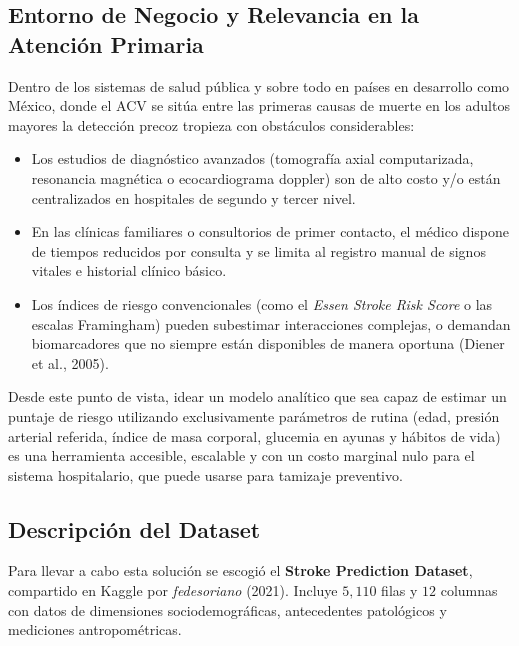 \documentclass[12pt,a4paper]{article}
\begin{document}
\subsection{Entorno de Negocio y Relevancia en la Atención Primaria}
Dentro de los sistemas de salud pública y sobre todo en países en desarrollo como México, donde el ACV se sitúa entre las primeras causas de muerte en los adultos mayores la detección precoz tropieza con obstáculos considerables:
\begin{itemize}[leftmargin=1.2cm, itemsep=0.2em]
    \item Los estudios de diagnóstico avanzados (tomografía axial computarizada, resonancia magnética o ecocardiograma doppler) son de alto costo y/o están centralizados en hospitales de segundo y tercer nivel.
    \item En las clínicas familiares o consultorios de primer contacto, el médico dispone de tiempos reducidos por consulta y se limita al registro manual de signos vitales e historial clínico básico.
    \item Los índices de riesgo convencionales (como el \textit{Essen Stroke Risk Score} o las escalas Framingham) pueden subestimar interacciones complejas, o demandan biomarcadores que no siempre están disponibles de manera oportuna (Diener et al., 2005).
\end{itemize}

Desde este punto de vista, idear un modelo analítico que sea capaz de estimar un puntaje de riesgo utilizando exclusivamente parámetros de rutina (edad, presión arterial referida, índice de masa corporal, glucemia en ayunas y hábitos de vida) es una herramienta accesible, escalable y con un costo marginal nulo para el sistema hospitalario, que puede usarse para tamizaje preventivo.

\subsection{Descripción del Dataset}
Para llevar a cabo esta solución se escogió el \textbf{Stroke Prediction Dataset}, compartido en Kaggle por \textit{fedesoriano} (2021). Incluye $5{,}110$ filas y $12$ columnas con datos de dimensiones sociodemográficas, antecedentes patológicos y mediciones antropométricas.
\end{document}
